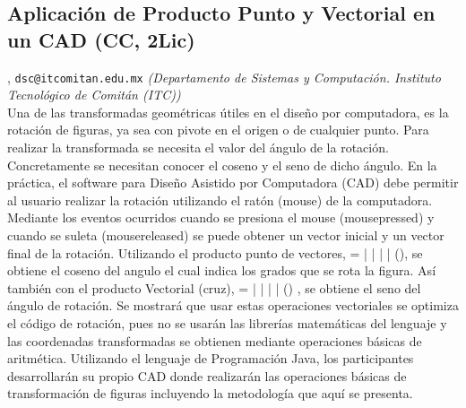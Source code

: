 \subsection{\sffamily Aplicación de Producto Punto y Vectorial en un CAD {\footnotesize (CC, 2Lic)}} \label{reg-1758} 
, {\tt dsc@itcomitan.edu.mx}  {\slshape (Departamento de Sistemas y Computación.  Instituto Tecnológico de Comitán (ITC))}\\
          \noindent Una de las transformadas geométricas útiles en el diseño por computadora, es la rotación de figuras, ya sea con pivote en el origen o de cualquier punto. Para realizar la transformada se necesita el valor del ángulo de la rotación. Concretamente se necesitan conocer el coseno y el seno de dicho ángulo. En la práctica, el software para Diseño Asistido por Computadora (CAD) debe permitir al usuario realizar la rotación utilizando el ratón (mouse) de la computadora. Mediante los eventos ocurridos cuando se presiona el mouse (mousepressed) y cuando se suleta (mousereleased) se puede obtener un vector inicial y un vector final de la rotación. Utilizando el  producto punto de vectores,  \cdot {} = \left |  \right | \cdot \left |  \right | \cos (\Theta ), se obtiene el coseno del angulo \Theta el cual indica los grados que se rota la figura. Así también con el producto Vectorial (cruz),   \times  {} = \left |  \right | \cdot \left |  \right | \sin (\Theta )  , se obtiene el seno del ángulo de rotación. Se mostrará que usar estas operaciones vectoriales se optimiza el código de rotación, pues no se usarán las librerías matemáticas del lenguaje y las coordenadas transformadas se obtienen mediante operaciones básicas de aritmética. Utilizando el lenguaje de Programación Java, los participantes desarrollarán su propio CAD donde realizarán las operaciones básicas de transformación de figuras incluyendo la metodología que aquí se presenta.  
